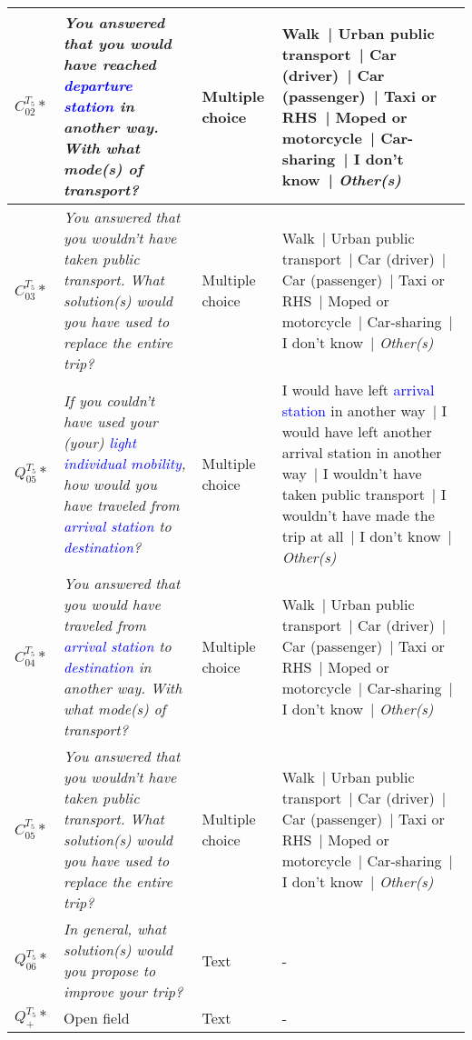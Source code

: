 \begin{table}[h!]
{\begin{tabular}{p{}p{}p{}p{}}
\hline
   \small{\(C_{02}^{T_{5}}*\)} & \small{\textsl{You answered that you would have reached \textcolor{blue}{departure station} in another way. With what mode(s) of transport?}} & \small{Multiple choice} & \small{Walk~| Urban public transport~| Car (driver)~| Car (passenger)~| Taxi or \acrshort{RHS}~| Moped or motorcycle~| Car-sharing~| I don't know~| \textsl{Other(s)}}\\
\hline
   \small{\(C_{03}^{T_{5}}*\)} & \small{\textsl{You answered that you wouldn't have taken public transport. What solution(s) would you have used to replace the entire trip?}} & \small{Multiple choice} & \small{Walk~| Urban public transport~| Car (driver)~| Car (passenger)~| Taxi or \acrshort{RHS}~| Moped or motorcycle~| Car-sharing~| I don't know~| \textsl{Other(s)}}\\
\hline
   \small{\textbf{\(Q_{05}^{T_{5}}*\)}} & \small{\textsl{If you couldn't have used your (your) \textcolor{blue}{light individual mobility}, how would you have traveled from \textcolor{blue}{arrival station} to \textcolor{blue}{destination}?}} & \small{Multiple choice} & \small{I would have left \textcolor{blue}{arrival station} in another way~| I would have left another arrival station in another way~| I wouldn't have taken public transport~| I wouldn't have made the trip at all~| I don't know~| \textsl{Other(s)}}\\
\hline
   \small{\(C_{04}^{T_{5}}*\)} & \small{\textsl{You answered that you would have traveled from \textcolor{blue}{arrival station} to \textcolor{blue}{destination} in another way. With what mode(s) of transport?}} & \small{Multiple choice} & \small{Walk~| Urban public transport~| Car (driver)~| Car (passenger)~| Taxi or \acrshort{RHS}~| Moped or motorcycle~| Car-sharing~| I don't know~| \textsl{Other(s)}}\\
\hline
   \small{\(C_{05}^{T_{5}}*\)} & \small{\textsl{You answered that you wouldn't have taken public transport. What solution(s) would you have used to replace the entire trip?}} & \small{Multiple choice} & \small{Walk~| Urban public transport~| Car (driver)~| Car (passenger)~| Taxi or \acrshort{RHS}~| Moped or motorcycle~| Car-sharing~| I don't know~| \textsl{Other(s)}}\\
\hline
   \small{\textbf{\(Q_{06}^{T_{5}}*\)}} & \small{\textsl{In general, what solution(s) would you propose to improve your trip?}} & \small{Text} & \small{-}\\
   \small{\textbf{\(Q_{+}^{T_{5}}*\)}} & \small{Open field} & \small{Text} & \small{-}\\
      \hline
    \end{tabular}}
    \caption*{}
    \vspace{5pt}
        \end{table}


